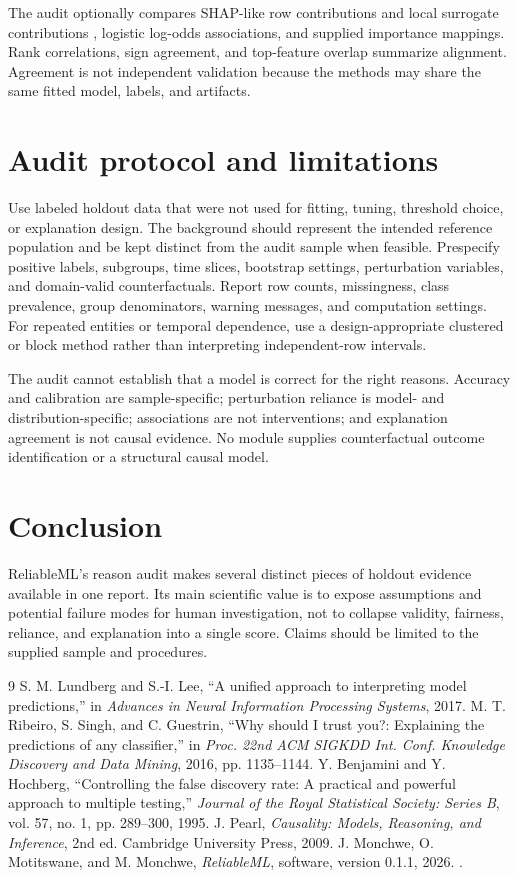 \documentclass[conference]{IEEEtran}
\begin{document}
The audit optionally compares SHAP-like row contributions and local surrogate contributions \cite{shap,lime}, logistic log-odds associations, and supplied importance mappings. Rank correlations, sign agreement, and top-feature overlap summarize alignment. Agreement is not independent validation because the methods may share the same fitted model, labels, and artifacts.

\section{Audit protocol and limitations}
Use labeled holdout data that were not used for fitting, tuning, threshold choice, or explanation design. The background should represent the intended reference population and be kept distinct from the audit sample when feasible. Prespecify positive labels, subgroups, time slices, bootstrap settings, perturbation variables, and domain-valid counterfactuals. Report row counts, missingness, class prevalence, group denominators, warning messages, and computation settings. For repeated entities or temporal dependence, use a design-appropriate clustered or block method rather than interpreting independent-row intervals.

The audit cannot establish that a model is correct for the right reasons. Accuracy and calibration are sample-specific; perturbation reliance is model- and distribution-specific; associations are not interventions; and explanation agreement is not causal evidence. No module supplies counterfactual outcome identification or a structural causal model.

\section{Conclusion}
ReliableML's reason audit makes several distinct pieces of holdout evidence available in one report. Its main scientific value is to expose assumptions and potential failure modes for human investigation, not to collapse validity, fairness, reliance, and explanation into a single score. Claims should be limited to the supplied sample and procedures.

\begin{thebibliography}{9}
 S. M. Lundberg and S.-I. Lee, ``A unified approach to interpreting model predictions,'' in \emph{Advances in Neural Information Processing Systems}, 2017.
 M. T. Ribeiro, S. Singh, and C. Guestrin, ``Why should I trust you?: Explaining the predictions of any classifier,'' in \emph{Proc. 22nd ACM SIGKDD Int. Conf. Knowledge Discovery and Data Mining}, 2016, pp. 1135--1144.
 Y. Benjamini and Y. Hochberg, ``Controlling the false discovery rate: A practical and powerful approach to multiple testing,'' \emph{Journal of the Royal Statistical Society: Series B}, vol. 57, no. 1, pp. 289--300, 1995.
 J. Pearl, \emph{Causality: Models, Reasoning, and Inference}, 2nd ed. Cambridge University Press, 2009.
 J. Monchwe, O. Motitswane, and M. Monchwe, \emph{ReliableML}, software, version 0.1.1, 2026. \projecturl.
\end{thebibliography}
\end{document}
